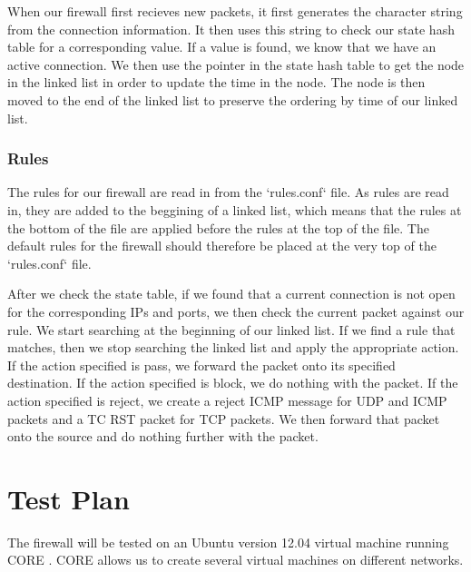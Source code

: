 \documentclass[12pt]{article} %
\begin{document}
When our firewall first recieves new packets, it first generates the character string from the connection information. It then uses this string to check our
state hash table for a corresponding value. If a value is found, we know that we have an active connection. We then use the pointer in the state hash table
to get the node in the linked list in order to update the time in the node. The node is then moved to the end of the linked list to preserve the ordering by
time of our linked list. 




\subsubsection{Rules}
The rules for our firewall are read in from the `rules.conf` file. As rules are read in, they are added to the beggining of a linked list, which
means that the rules at the bottom of the file are applied before the rules at the top of the file. The default rules for the firewall should 
therefore be placed at the very top of the `rules.conf` file. 

After we check the state table, if we found that a current connection is not open for the corresponding IPs and ports, we then check the current 
packet against our rule. We start searching at the beginning of our linked list. If we find a rule that matches, then we stop searching the linked list 
and apply the appropriate action. If the action specified is pass, we forward the packet onto its specified destination. If the action specified
is block, we do nothing with the packet. If the action specified is reject, we create a reject ICMP message for UDP and ICMP packets and a TC RST packet
for TCP packets. We then forward that packet onto the source and do nothing further with the packet. 





\section{Test Plan} %
The firewall will be tested on an Ubuntu version 12.04 virtual machine running CORE \cite{core}. 
CORE allows us to create several virtual machines on different networks. 
\end{document}
